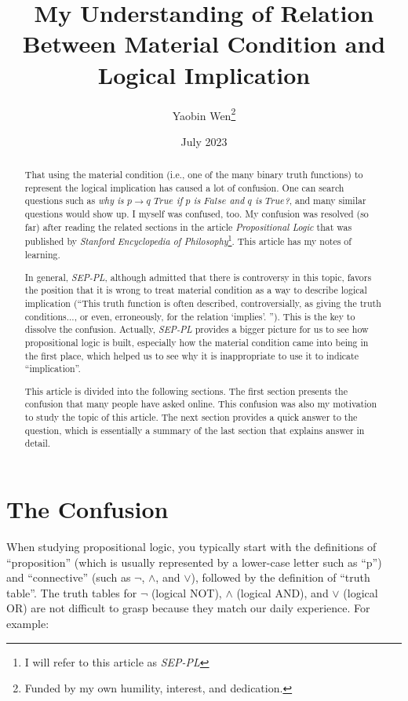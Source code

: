 \documentclass[12pt, letterpaper]{article}
\title{
  My Understanding of Relation Between Material Condition and Logical
  Implication
}
\author{
  Yaobin Wen\thanks{Funded by my own humility, interest, and dedication.}
}
\date{July 2023}
\begin{document}
\maketitle

\begin{abstract}
  That using the material condition (i.e., one of the many binary truth
  functions) to represent the logical implication has caused a lot of confusion.
  One can search questions such as \textit{why is $p \rightarrow q$ $True$ if
    $p$ is $False$ and $q$ is $True$?}, and many similar questions would show up.
  I myself was confused, too. My confusion was resolved (so far) after reading
  the related sections in the article \textit{Propositional Logic} that was
  published by \textit{Stanford Encyclopedia of Philosophy}\footnote{I will
    refer to this article as \textit{SEP-PL}}. This article has my notes of
  learning.

  In general, \textit{SEP-PL}, although admitted that there is controversy in
  this topic, favors the position that it is wrong to treat material condition
  as a way to describe logical implication (``This truth function is often
  described, controversially, as giving the truth conditions..., or even,
  erroneously, for the relation `implies'. ''). This is the key to dissolve the
  confusion. Actually, \textit{SEP-PL} provides a bigger picture for us to see
  how propositional logic is built, especially how the material condition came
  into being in the first place, which helped us to see why it is inappropriate
  to use it to indicate ``implication''.

  This article is divided into the following sections. The first section
  presents the confusion that many people have asked online. This confusion was
  also my motivation to study the topic of this article. The next section
  provides a quick answer to the question, which is essentially a summary of
  the last section that explains answer in detail.
\end{abstract}

\section{The Confusion}

When studying propositional logic, you typically start with the definitions of
``proposition'' (which is usually represented by a lower-case letter such as
``p'') and ``connective'' (such as $\lnot$, $\land$, and $\lor$), followed by
the definition of ``truth table''. The truth tables for $\lnot$ (logical NOT),
$\land$ (logical AND), and $\lor$ (logical OR) are not difficult to grasp
because they match our daily experience. For example:
\end{document}
